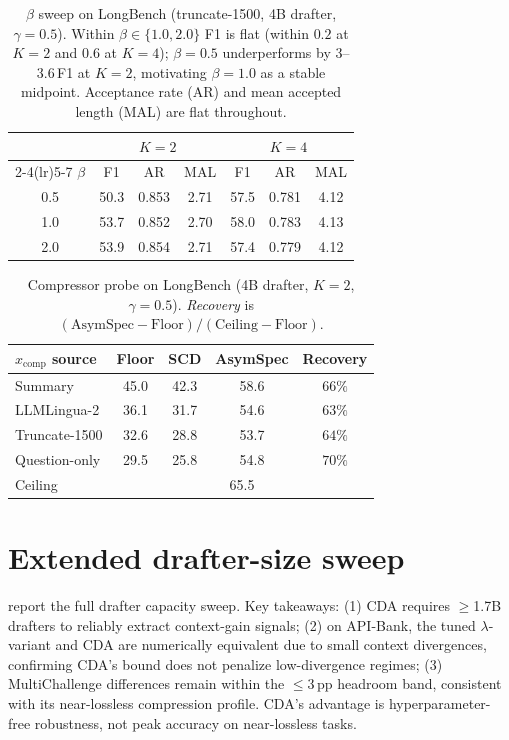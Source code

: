 \documentclass[11pt]{article}
\theoremstyle{plain}
\theoremstyle{definition}
\begin{document}
\begin{table}[h]
\centering
\footnotesize
\setlength{\tabcolsep}{6pt}
\begin{tabular}{ccccccc}
\toprule
& \multicolumn{3}{c}{$K{=}2$} & \multicolumn{3}{c}{$K{=}4$} \\
\cmidrule(lr){2-4}\cmidrule(lr){5-7}
$\beta$ & F1 & AR & MAL & F1 & AR & MAL \\
\midrule
0.5 & 50.3 & 0.853 & 2.71 & 57.5 & 0.781 & 4.12 \\
1.0 & 53.7 & 0.852 & 2.70 & 58.0 & 0.783 & 4.13 \\
2.0 & 53.9 & 0.854 & 2.71 & 57.4 & 0.779 & 4.12 \\
\bottomrule
\end{tabular}
\caption{$\beta$ sweep on LongBench (truncate-1500, 4B drafter, $\gamma{=}0.5$). Within $\beta\in\{1.0, 2.0\}$ F1 is flat (within $0.2$ at $K{=}2$ and $0.6$ at $K{=}4$); $\beta{=}0.5$ underperforms by $3$--$3.6$\,F1 at $K{=}2$, motivating $\beta{=}1.0$ as a stable midpoint. Acceptance rate (AR) and mean accepted length (MAL) are flat throughout.}
\label{tab:beta_sweep}
\end{table}

\begin{table}[h]
\centering
\footnotesize
\setlength{\tabcolsep}{5pt}
\begin{tabular}{lcccc}
\toprule
$x_{\text{comp}}$ source & Floor & SCD & AsymSpec & Recovery \\
\midrule
Summary       & 45.0 & 42.3 & 58.6 & $66\%$ \\
LLMLingua-2   & 36.1 & 31.7 & 54.6 & $63\%$ \\
Truncate-1500 & 32.6 & 28.8 & 53.7 & $64\%$ \\
Question-only & 29.5 & 25.8 & 54.8 & $70\%$ \\
\midrule
Ceiling & \multicolumn{4}{c}{65.5} \\
\bottomrule
\end{tabular}
\caption{Compressor probe on LongBench (4B drafter, $K{=}2$, $\gamma{=}0.5$). \emph{Recovery} is $(\text{AsymSpec}-\text{Floor})/(\text{Ceiling}-\text{Floor})$.}
\label{tab:comp_orth}
\end{table}

\section{Extended drafter-size sweep}
\label{appx:drafter-sweep-extra}
 report the full drafter capacity sweep. Key takeaways: (1) CDA requires $\ge$1.7B drafters to reliably extract context-gain signals; (2) on API-Bank, the tuned $\lambda$-variant and CDA are numerically equivalent due to small context divergences, confirming CDA's bound does not penalize low-divergence regimes; (3) MultiChallenge differences remain within the $\le$3\,pp headroom band, consistent with its near-lossless compression profile. CDA's advantage is hyperparameter-free robustness, not peak accuracy on near-lossless tasks.
\end{document}
